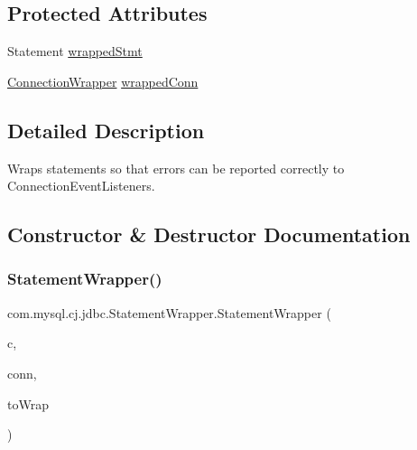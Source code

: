 \subsection*{Protected Attributes}
\begin{DoxyCompactItemize}
\item 
Statement \mbox{\hyperlink{classcom_1_1mysql_1_1cj_1_1jdbc_1_1_statement_wrapper_a237cb10a8c5fbde91ad58f91d4448504}{wrapped\+Stmt}}
\item 
\mbox{\hyperlink{classcom_1_1mysql_1_1cj_1_1jdbc_1_1_connection_wrapper}{Connection\+Wrapper}} \mbox{\hyperlink{classcom_1_1mysql_1_1cj_1_1jdbc_1_1_statement_wrapper_aa24a3511780470aabd51d2a769217c21}{wrapped\+Conn}}
\end{DoxyCompactItemize}


\subsection{Detailed Description}
Wraps statements so that errors can be reported correctly to Connection\+Event\+Listeners. 

\subsection{Constructor \& Destructor Documentation}
\mbox{\label{classcom_1_1mysql_1_1cj_1_1jdbc_1_1_statement_wrapper_aa2cfcaa026fa0f9eb6ddca4c1bc52020}} 
\subsubsection{\texorpdfstring{Statement\+Wrapper()}{StatementWrapper()}}
{\footnotesize\ttfamily com.\+mysql.\+cj.\+jdbc.\+Statement\+Wrapper.\+Statement\+Wrapper (\begin{DoxyParamCaption}\item[{\mbox{\hyperlink{classcom_1_1mysql_1_1cj_1_1jdbc_1_1_connection_wrapper}{Connection\+Wrapper}}}]{c,  }\item[{\mbox{\hyperlink{classcom_1_1mysql_1_1cj_1_1jdbc_1_1_mysql_pooled_connection}{Mysql\+Pooled\+Connection}}}]{conn,  }\item[{Statement}]{to\+Wrap }\end{DoxyParamCaption})}




